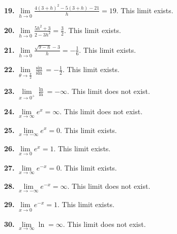 \documentclass[12pt,]{book}
\theoremstyle{plain}
\theoremstyle{definition}
\numberwithin{equation}{section}
\newcommand{\fe}[2]{\mathop{{#1}{\left(#2\right)}}}
\begin{document}
                \par\smallskip
\noindent\textbf{19.}\quad{}
                    \(\lim\limits_{h\to0}\frac{4(3+h)^2-5(3+h)-21}{h}=19\). This limit exists.%

                \par\smallskip
\noindent\textbf{20.}\quad{}
                    \(\lim\limits_{h\to0}\frac{5h^2+3}{2-3h^2}=\frac{3}{2}\). This limit exists.%

                \par\smallskip
\noindent\textbf{21.}\quad{}
                    \(\lim\limits_{h\to0}\frac{\sqrt{9-h}-3}{h}=-\frac{1}{6}\). This limit exists.%

                \par\smallskip
\noindent\textbf{22.}\quad{}
                    \(\lim\limits_{\theta\to\frac{\pi}{2}}\frac{\fe{\sin}{\theta+\frac{\pi}{2}}}{\fe{\sin}{2\theta+\pi}}=-\frac{1}{2}\). This limit exists.%

                \par\smallskip
\noindent\textbf{23.}\quad{}
                    \(\lim\limits_{x\to0^{+}}\frac{\fe{\ln}{x^e}}{\fe{\ln}{e^x}}=-\infty\). This limit does not exist.%

                \par\smallskip
\noindent\textbf{24.}\quad{}
                    \(\lim\limits_{x\to\infty}e^x=\infty\). This limit does not exist.%

                \par\smallskip
\noindent\textbf{25.}\quad{}
                    \(\lim\limits_{x\to-\infty}e^x=0\). This limit exists.%

                \par\smallskip
\noindent\textbf{26.}\quad{}
                    \(\lim\limits_{x\to0}e^x=1\). This limit exists.%

                \par\smallskip
\noindent\textbf{27.}\quad{}
                    \(\lim\limits_{x\to\infty}e^{-x}=0\). This limit exists.%

                \par\smallskip
\noindent\textbf{28.}\quad{}
                    \(\lim\limits_{x\to-\infty}e^{-x}=\infty\). This limit does not exist.%

                \par\smallskip
\noindent\textbf{29.}\quad{}
                    \(\lim\limits_{x\to0}e^{-x}=1\). This limit exists.%

                \par\smallskip
\noindent\textbf{30.}\quad{}
                    \(\lim\limits_{x\to\infty}\fe{\ln}{x}=\infty\). This limit does not exist.%
\end{document}
